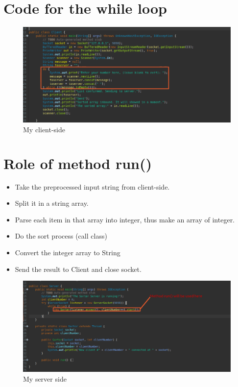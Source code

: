 \documentclass[11pt,a4paper]{report}
\begin{document}
	\section{Code for the while loop}
	\begin{figure}[h!]
  		\includegraphics[width=\linewidth]{client-code.png}
  		\caption{My client-side}
  		\label{fig:client}
	\end{figure}
	\newpage
	\section{Role of method run()}
	\begin{itemize}
		\item Take the preprocessed input string from client-side.
		\item Split it in a string array.
		\item Parse each item in that array into integer, thus make an array of integer.
		\item Do the sort process (call class)
		\item Convert the integer array to String
		\item Send the result to Client and close socket.
	\end{itemize}
	\begin{figure}[h!]
  		\includegraphics[width=\linewidth]{server-code.png}
  		\caption{My server side}
  		\label{fig:server}
	\end{figure}
\end{document}
